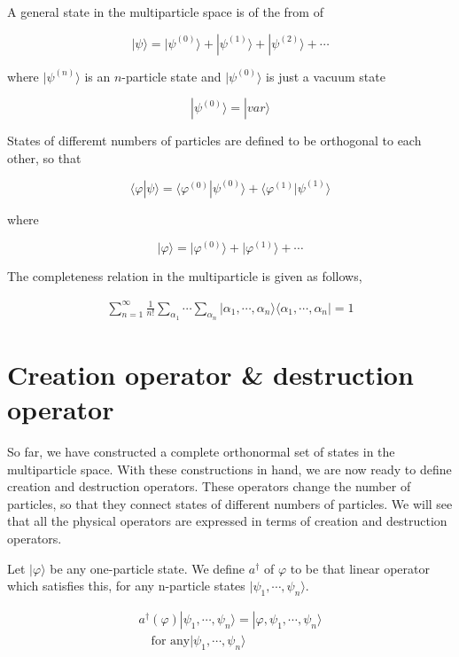 A general state in the multiparticle space is of the from of 

\[|\psi\rangle = |\psi^{(0)}\rangle + |\psi^{(1)}\rangle + |\psi^{(2)}\rangle + \cdots \]

where $|\psi^{(n)}\rangle$ is an $n$-particle state and $|\psi^{(0)}\rangle$ is just a vacuum state

\[|\psi^{(0)}\rangle = |var\rangle \]

States of differemt numbers of particles are defined to be orthogonal to each other, so that

\[\langle\varphi|\psi\rangle = \langle\varphi^{(0)}|\psi^{(0)}\rangle + \langle\varphi^{(1)}|\psi^{(1)}\rangle  \]

where

\[|\varphi\rangle = |\varphi^{(0)}\rangle + |\varphi^{(1)}\rangle + \cdots \]

The completeness relation in the multiparticle is given as follows, 

\begin{align}
\sum_{n=1}^{\infty}\frac{1}{n!}\sum_{\alpha_1}\cdots\sum_{\alpha_n}|\alpha_1,\cdots,\alpha_n\rangle\langle \alpha_1,\cdots,\alpha_n| = 1
\end{align}



\section{Creation operator \& destruction operator}

So far, we have constructed a complete orthonormal set of states in the multiparticle space. With these constructions in hand, we are now ready to define creation and destruction operators. These operators change the number of particles, so that they connect states of different numbers of particles. We will see that all the physical operators are expressed in terms of creation and destruction operators. 

Let $|\varphi\rangle$ be any one-particle state. We define $a^\dagger$ of $\varphi$ to be that linear operator which satisfies this, for any n-particle states $|\psi_1, \cdots,\psi_n\rangle$. 

\begin{align}
a^\dagger(\varphi)|\psi_1,\cdots,\psi_n\rangle = |\varphi,\psi_1,\cdots,\psi_n\rangle \tag{e}\\
\quad\text{for any}|\psi_1,\cdots,\psi_n\rangle \label{Eqs1.6.1}
\end{align}

